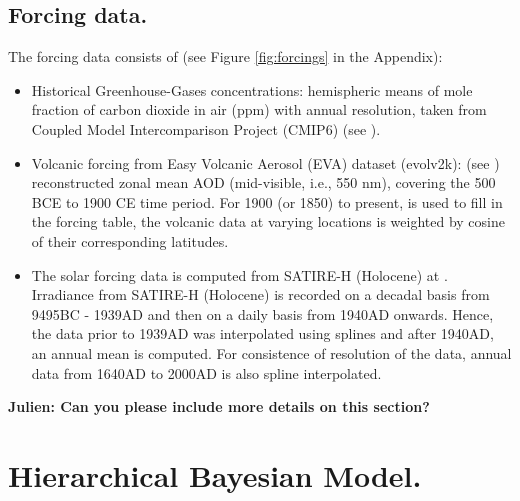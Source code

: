\documentclass[11pt]{amsart}
\theoremstyle{plain}
\theoremstyle{definition}
\theoremstyle{remark}
\begin{document}
\subsection{Forcing data.}
The forcing data consists of (see Figure \ref{fig:forcings} in the Appendix):
\begin{itemize}
\item Historical Greenhouse-Gases concentrations: hemispheric means of mole
  fraction of carbon dioxide in air (ppm) with annual
  resolution, taken from Coupled Model Intercomparison Project (CMIP6) (see
  \cite{Meinshausen2016}).
  
\item Volcanic forcing from Easy Volcanic Aerosol (EVA) dataset (evolv2k): (see
  \cite{Toohey2016}) reconstructed zonal mean AOD (mid-visible, i.e., 550 nm), covering the
  500 BCE to 1900 CE time period. For 1900 (or 1850) to present, \cite{Thomason2016} is
  used to fill in the forcing table, the volcanic data at varying locations is
  weighted by cosine of their corresponding latitudes.
  
\item The solar forcing data is computed from SATIRE-H
  (Holocene) at \cite{Vieira2011}. Irradiance from SATIRE-H (Holocene) is
  recorded on a decadal basis from 9495BC - 1939AD and then on a daily basis
  from 1940AD onwards. Hence, the data prior to 1939AD was interpolated using splines and after 1940AD, an annual mean is computed. For consistence of resolution of the data, annual data from 1640AD to 2000AD is also spline interpolated.
\end{itemize}
\textbf{Julien: Can you please include more details on this section?}
\section{Hierarchical Bayesian Model.}
\label{sec:model}
\end{document}
